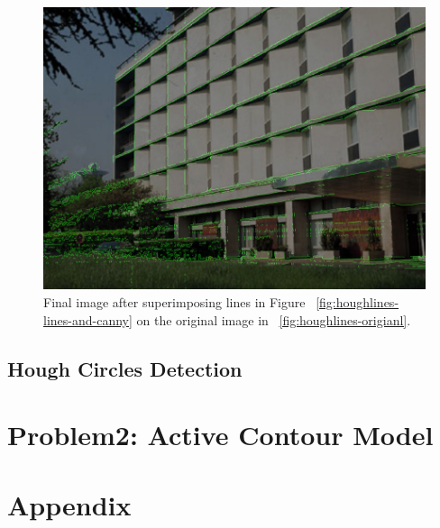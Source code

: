\documentclass[letterpaper, 10 pt, conference ,onecolumn]{ieeeconf}  %
\begin{document}
\begin{figure}[h!]
\includegraphics[width=0.4\paperwidth]{hough-lines/final-image.jpg}
\caption{Final image after superimposing lines in Figure ~\ref{fig:houghlines-lines-and-canny} on the original image in ~\ref{fig:houghlines-origianl}. }
\label{fig:houghlines-final}
\end{figure}

\newpage
\subsection{ Hough Circles Detection }



\newpage

\section*{Problem2: Active Contour Model}


\section*{Appendix }







\end{document}
